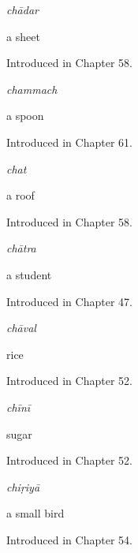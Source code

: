 \noindent\begin{minipage}[t]{\linewidth}
\raggedright
\textbf{}\enspace\emph{chādar}\par
\small a sheet\par
\footnotesize Introduced in Chapter 58.
\end{minipage}\par\medskip

\noindent\begin{minipage}[t]{\linewidth}
\raggedright
\textbf{}\enspace\emph{chammach}\par
\small a spoon\par
\footnotesize Introduced in Chapter 61.
\end{minipage}\par\medskip

\noindent\begin{minipage}[t]{\linewidth}
\raggedright
\textbf{}\enspace\emph{chat}\par
\small a roof\par
\footnotesize Introduced in Chapter 58.
\end{minipage}\par\medskip

\noindent\begin{minipage}[t]{\linewidth}
\raggedright
\textbf{}\enspace\emph{chātra}\par
\small a student\par
\footnotesize Introduced in Chapter 47.
\end{minipage}\par\medskip

\noindent\begin{minipage}[t]{\linewidth}
\raggedright
\textbf{}\enspace\emph{chāval}\par
\small rice\par
\footnotesize Introduced in Chapter 52.
\end{minipage}\par\medskip

\noindent\begin{minipage}[t]{\linewidth}
\raggedright
\textbf{}\enspace\emph{chīnī}\par
\small sugar\par
\footnotesize Introduced in Chapter 52.
\end{minipage}\par\medskip

\noindent\begin{minipage}[t]{\linewidth}
\raggedright
\textbf{}\enspace\emph{chiṛiyā}\par
\small a small bird\par
\footnotesize Introduced in Chapter 54.
\end{minipage}\par\medskip

